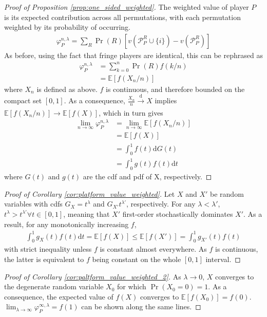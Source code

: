 \documentclass[a4paper]{article}
\newcommand{\dt}{\mathrm{d}t}
\newcommand{\E}{\mathbb{E}}
\begin{document}
\begin{proof}[Proof of Proposition \ref{prop:one_sided_weighted}]
    The weighted value of player $P$ is its expected contribution across all permutations, with each permutation weighted by its probability of occurring.
    \begin{align*}
        \varphi_P^{n, \lambda} = \sum_R \Pr(R) [v(\mathcal{P}_P^R \cup \{i\}) - v(\mathcal{P}_P^R)]
    \end{align*}
    As before, using the fact that fringe players are identical, this can be rephrased as
    \begin{align*}
        \varphi_P^{n, \lambda} &= \sum_{k=0}^n \Pr(R) f(k/n) \\
        &= \E[f(X_n / n)]
    \end{align*}
    where $X_n$ is defined as above. $f$ is continuous, and therefore bounded on the compact set $[0, 1]$. As a consequence, $\frac{X_n}{n} \xrightarrow[]{\mathrm{d}} X$ implies $\E[f(X_n / n)] \to \E[f(X)]$, which in turn gives
    \begin{align*}
        \lim_{n \to \infty} \varphi_P^{n, \lambda} &= \lim_{n \to \infty} \E[f(X_n / n)] \\
        &= \E[f(X)] \\
        &= \int_0^1 f(t) \mathrm{d}G(t) \\
        &= \int_0^1 g(t)f(t) \dt
    \end{align*}
    where $G(t)$ and $g(t)$ are the cdf and pdf of X, respectively.
\end{proof}

\begin{proof}[Proof of Corollary \ref{cor:platform_value_weighted}]
    Let $X$ and $X'$ be random variables with cdfs $G_X = t^\lambda$ and $G_{X'}t^{\lambda'}$, respectively. For any $\lambda < \lambda'$, $t^\lambda > t^{\lambda'} \forall t \in [0, 1]$, meaning that $X'$ first-order stochastically dominates $X'$. As a result, for any monotonically increasing $f$,
    \begin{align*}
        \int_0^1 g_X(t)f(t) \dt = \E[f(X)] \leq \E[f(X')] = \int_0^1 g_{X'}(t)f(t)
    \end{align*}
    with strict inequality unless $f$ is constant almost everywhere. As $f$ is continuous, the latter is equivalent to $f$ being constant on the whole $[0, 1]$ interval.
\end{proof}

\begin{proof}[Proof of Corollary \ref{cor:paltform_value_weighted_2}]
    As $\lambda \to 0$, $X$ converges to the degenerate random variable $X_0$ for which $\Pr(X_0 = 0) = 1$. As a consequence, the expected value of $f(X)$ converges to $\E[f(X_0)] = f(0)$. $\lim_{\lambda \to \infty} \varphi^{\infty, \lambda}_P = f(1)$ can be shown along the same lines.
\end{proof}
\end{document}
